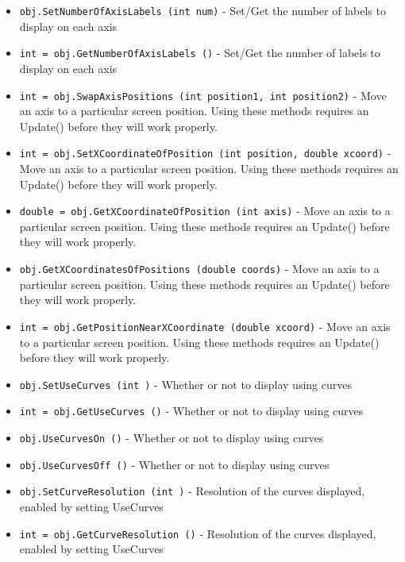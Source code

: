 \begin{itemize}
\item  \verb|obj.SetNumberOfAxisLabels (int num)| -  Set/Get the number of labels to display on each axis

\item  \verb|int = obj.GetNumberOfAxisLabels ()| -  Set/Get the number of labels to display on each axis

\item  \verb|int = obj.SwapAxisPositions (int position1, int position2)| -  Move an axis to a particular screen position.  Using these
 methods requires an Update() before they will work properly.

\item  \verb|int = obj.SetXCoordinateOfPosition (int position, double xcoord)| -  Move an axis to a particular screen position.  Using these
 methods requires an Update() before they will work properly.

\item  \verb|double = obj.GetXCoordinateOfPosition (int axis)| -  Move an axis to a particular screen position.  Using these
 methods requires an Update() before they will work properly.

\item  \verb|obj.GetXCoordinatesOfPositions (double coords)| -  Move an axis to a particular screen position.  Using these
 methods requires an Update() before they will work properly.

\item  \verb|int = obj.GetPositionNearXCoordinate (double xcoord)| -  Move an axis to a particular screen position.  Using these
 methods requires an Update() before they will work properly.

\item  \verb|obj.SetUseCurves (int )| -  Whether or not to display using curves

\item  \verb|int = obj.GetUseCurves ()| -  Whether or not to display using curves

\item  \verb|obj.UseCurvesOn ()| -  Whether or not to display using curves

\item  \verb|obj.UseCurvesOff ()| -  Whether or not to display using curves

\item  \verb|obj.SetCurveResolution (int )| -  Resolution of the curves displayed, enabled by setting UseCurves

\item  \verb|int = obj.GetCurveResolution ()| -  Resolution of the curves displayed, enabled by setting UseCurves


\end{itemize}
